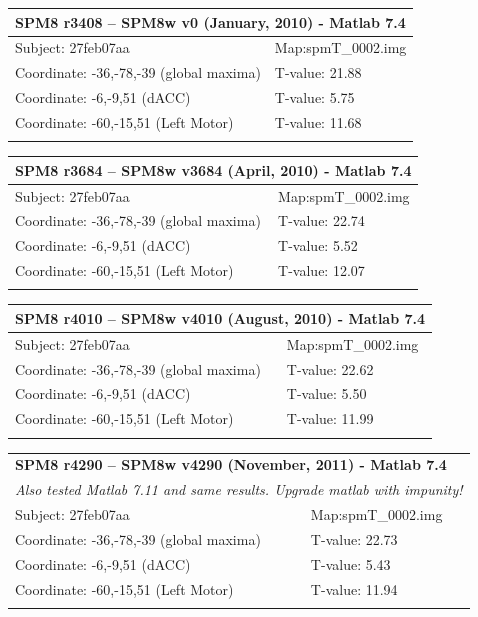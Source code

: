 \documentclass[12pt]{article}
\begin{document}
\begin{center}
\begin{tabular}{ll}
	\hline
	\multicolumn{2}{l}{\textbf{SPM8 r3408 -- SPM8w v0 (January, 2010) - Matlab 7.4}}\\
	\hline
	Subject: 27feb07aa & Map:spmT\_0002.img\\
	\hline
	Coordinate: -36,-78,-39 (global maxima) & T-value: 21.88\\
	Coordinate: -6,-9,51 (dACC) & T-value: 5.75\\
	Coordinate: -60,-15,51 (Left Motor) & T-value: 11.68\\
	\hline \\
\end{tabular}

\begin{tabular}{ll}
	\hline
	\multicolumn{2}{l}{\textbf{SPM8 r3684 -- SPM8w v3684 (April, 2010) - Matlab 7.4}}\\
	\hline
	Subject: 27feb07aa & Map:spmT\_0002.img\\
	\hline
	Coordinate: -36,-78,-39 (global maxima) & T-value: 22.74\\
	Coordinate: -6,-9,51 (dACC) & T-value: 5.52\\
	Coordinate: -60,-15,51 (Left Motor) & T-value: 12.07\\
	\hline \\
\end{tabular}

\begin{tabular}{ll}
	\hline
	\multicolumn{2}{l}{\textbf{SPM8 r4010 -- SPM8w v4010 (August, 2010) - Matlab 7.4}}\\
	\hline
	Subject: 27feb07aa & Map:spmT\_0002.img\\
	\hline
	Coordinate: -36,-78,-39 (global maxima) & T-value: 22.62\\
	Coordinate: -6,-9,51 (dACC) & T-value: 5.50\\
	Coordinate: -60,-15,51 (Left Motor) & T-value: 11.99\\
	\hline \\
\end{tabular}

\begin{tabular}{ll}
	\hline
	\multicolumn{2}{l}{\textbf{SPM8 r4290 -- SPM8w v4290 (November, 2011) - Matlab 7.4}}\\
	\multicolumn{2}{l}{\textit{Also tested Matlab 7.11 and same results. Upgrade matlab with impunity!}}\\
	\hline
	Subject: 27feb07aa & Map:spmT\_0002.img\\
	\hline
	Coordinate: -36,-78,-39 (global maxima) & T-value: 22.73\\
	Coordinate: -6,-9,51 (dACC) & T-value: 5.43\\
	Coordinate: -60,-15,51 (Left Motor) & T-value: 11.94\\
	\hline \\
\end{tabular}


\end{center}
\end{document}
